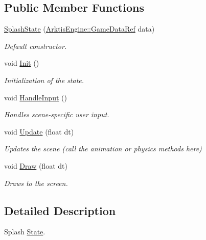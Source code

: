 \subsection*{Public Member Functions}
\begin{DoxyCompactItemize}
\item 
\mbox{\hyperlink{class_states_1_1_splash_state_a9f8047d3c5043ae63c4f82dfd9363149}{Splash\+State}} (\mbox{\hyperlink{namespace_arktis_engine_a52e783ae007274e2a6eccc201d9400a5}{Arktis\+Engine\+::\+Game\+Data\+Ref}} data)
\begin{DoxyCompactList}\small\item\em Default constructor. \end{DoxyCompactList}\item 
void \mbox{\hyperlink{class_states_1_1_splash_state_a666571efc81c245ed9e2c8c2baaf920b}{Init}} ()
\begin{DoxyCompactList}\small\item\em Initialization of the state. \end{DoxyCompactList}\item 
void \mbox{\hyperlink{class_states_1_1_splash_state_a0bd8d0bc42837fa395cc3bc5c53935f2}{Handle\+Input}} ()
\begin{DoxyCompactList}\small\item\em Handles scene-\/specific user input. \end{DoxyCompactList}\item 
void \mbox{\hyperlink{class_states_1_1_splash_state_acf5f51ee32ca2a1634ce56dca901cad9}{Update}} (float dt)
\begin{DoxyCompactList}\small\item\em Updates the scene (call the animation or physics methods here) \end{DoxyCompactList}\item 
void \mbox{\hyperlink{class_states_1_1_splash_state_adae0af95808a668cd29b537d7126735f}{Draw}} (float dt)
\begin{DoxyCompactList}\small\item\em Draws to the screen. \end{DoxyCompactList}\end{DoxyCompactItemize}


\subsection{Detailed Description}
Splash \mbox{\hyperlink{class_states_1_1_state}{State}}. 

